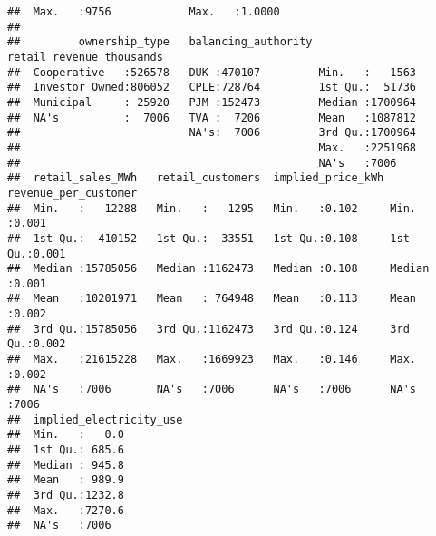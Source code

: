 \documentclass[]{article}
\begin{document}
\begin{verbatim}
##  Max.   :9756            Max.   :1.0000                         
##                                                                 
##         ownership_type   balancing_authority retail_revenue_thousands
##  Cooperative   :526578   DUK :470107         Min.   :   1563         
##  Investor Owned:806052   CPLE:728764         1st Qu.:  51736         
##  Municipal     : 25920   PJM :152473         Median :1700964         
##  NA's          :  7006   TVA :  7206         Mean   :1087812         
##                          NA's:  7006         3rd Qu.:1700964         
##                                              Max.   :2251968         
##                                              NA's   :7006            
##  retail_sales_MWh   retail_customers  implied_price_kWh revenue_per_customer
##  Min.   :   12288   Min.   :   1295   Min.   :0.102     Min.   :0.001       
##  1st Qu.:  410152   1st Qu.:  33551   1st Qu.:0.108     1st Qu.:0.001       
##  Median :15785056   Median :1162473   Median :0.108     Median :0.001       
##  Mean   :10201971   Mean   : 764948   Mean   :0.113     Mean   :0.002       
##  3rd Qu.:15785056   3rd Qu.:1162473   3rd Qu.:0.124     3rd Qu.:0.002       
##  Max.   :21615228   Max.   :1669923   Max.   :0.146     Max.   :0.002       
##  NA's   :7006       NA's   :7006      NA's   :7006      NA's   :7006        
##  implied_electricity_use
##  Min.   :   0.0         
##  1st Qu.: 685.6         
##  Median : 945.8         
##  Mean   : 989.9         
##  3rd Qu.:1232.8         
##  Max.   :7270.6         
##  NA's   :7006
\end{verbatim}
\end{document}
